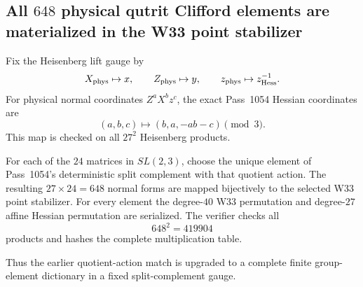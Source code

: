 \subsection*{All $648$ physical qutrit Clifford elements are materialized in the W33 point stabilizer}
Fix the Heisenberg lift gauge by
\[
X_{\rm phys}\mapsto x,\qquad Z_{\rm phys}\mapsto y,\qquad
z_{\rm phys}\mapsto z_{\rm Hess}^{-1}.
\]
For physical normal coordinates \(Z^aX^bz^c\), the exact Pass~1054 Hessian coordinates are
\[
\boxed{(a,b,c)\mapsto(b,a,-ab-c)\pmod3}.
\]
This map is checked on all \(27^2\) Heisenberg products.

For each of the \(24\) matrices in \(SL(2,3)\), choose the unique element of Pass~1054's deterministic split complement with that quotient action. The resulting \(27\times24=648\) normal forms are mapped bijectively to the selected W33 point stabilizer. For every element the degree-$40$ W33 permutation and degree-$27$ affine Hessian permutation are serialized. The verifier checks all
\[
648^2=419904
\]
products and hashes the complete multiplication table.

Thus the earlier quotient-action match is upgraded to a complete finite group-element dictionary in a fixed split-complement gauge.
